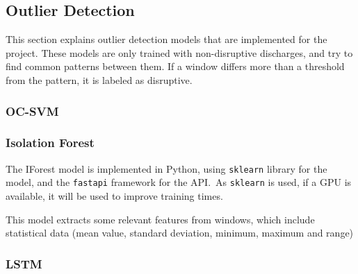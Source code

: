 \subsection{Outlier Detection}

This section explains outlier detection models that are implemented for the project. These models are only trained with non-disruptive discharges, and try to find common patterns between them. If a window differs more than a threshold from the pattern, it is labeled as disruptive.

\subsubsection{\acs{OC-SVM}}

\subsubsection{Isolation Forest}

The \ac{IForest} model is implemented in Python, using \texttt{sklearn} library for the model, and the \texttt{fastapi} framework for the API.\ As \texttt{sklearn} is used, if a \ac{GPU} is available, it will be used to improve training times.

This model extracts some relevant features from windows, which include statistical data (mean value, standard deviation, minimum, maximum and range)

\subsubsection{\acs{LSTM}}

